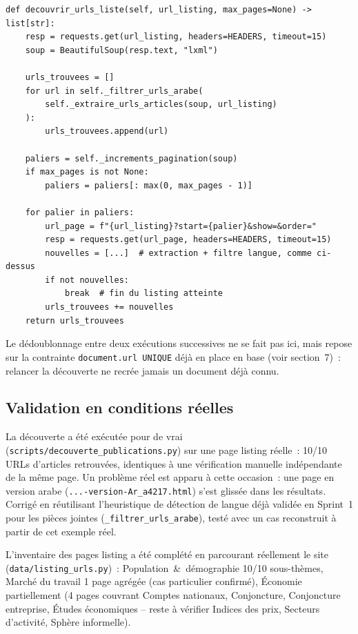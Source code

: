 \documentclass[11pt,a4paper]{article}
\begin{document}
\begin{lstlisting}[caption={\texttt{src/scraper.py} -- suivi de la pagination reelle}]
def decouvrir_urls_liste(self, url_listing, max_pages=None) -> list[str]:
    resp = requests.get(url_listing, headers=HEADERS, timeout=15)
    soup = BeautifulSoup(resp.text, "lxml")

    urls_trouvees = []
    for url in self._filtrer_urls_arabe(
        self._extraire_urls_articles(soup, url_listing)
    ):
        urls_trouvees.append(url)

    paliers = self._increments_pagination(soup)
    if max_pages is not None:
        paliers = paliers[: max(0, max_pages - 1)]

    for palier in paliers:
        url_page = f"{url_listing}?start={palier}&show=&order="
        resp = requests.get(url_page, headers=HEADERS, timeout=15)
        nouvelles = [...]  # extraction + filtre langue, comme ci-dessus
        if not nouvelles:
            break  # fin du listing atteinte
        urls_trouvees += nouvelles
    return urls_trouvees
\end{lstlisting}

Le d\'edoublonnage entre deux ex\'ecutions successives ne se fait pas ici, mais repose sur la contrainte \texttt{document.url UNIQUE} d\'ej\`a en place en base (voir section~7)~: relancer la d\'ecouverte ne recr\'ee jamais un document d\'ej\`a connu.

\subsection{Validation en conditions r\'eelles}
La d\'ecouverte a \'et\'e ex\'ecut\'ee pour de vrai (\texttt{scripts/decouverte\_publications.py}) sur une page listing r\'eelle~: 10/10 URLs d'articles retrouv\'ees, identiques \`a une v\'erification manuelle ind\'ependante de la m\^eme page. Un probl\`eme r\'eel est apparu \`a cette occasion~: une page en version arabe (\texttt{...-version-Ar\_a4217.html}) s'est gliss\'ee dans les r\'esultats. Corrig\'e en r\'eutilisant l'heuristique de d\'etection de langue d\'ej\`a valid\'ee en Sprint~1 pour les pi\`eces jointes (\texttt{\_filtrer\_urls\_arabe}), test\'e avec un cas reconstruit \`a partir de cet exemple r\'eel.

L'inventaire des pages listing a \'et\'e compl\'et\'e en parcourant r\'eellement le site (\texttt{data/listing\_urls.py})~: Population~\&~d\'emographie 10/10 sous-th\`emes, March\'e du travail 1 page agr\'eg\'ee (cas particulier confirm\'e), \'Economie partiellement (4 pages couvrant Comptes nationaux, Conjoncture, Conjoncture entreprise, \'Etudes \'economiques -- reste \`a v\'erifier Indices des prix, Secteurs d'activit\'e, Sph\`ere informelle).
\end{document}
